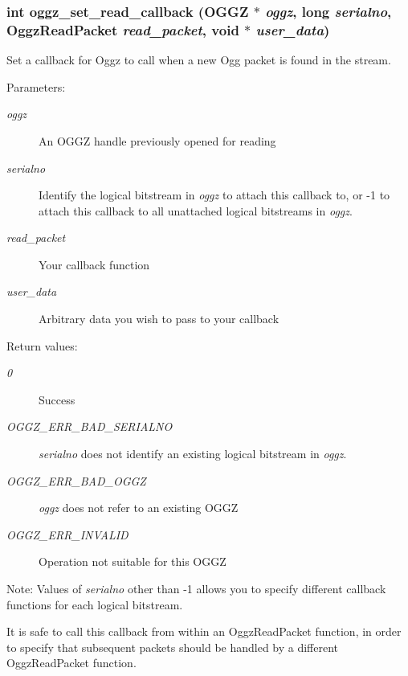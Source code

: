 \subsubsection{\setlength{\rightskip}{0pt plus 5cm}int oggz\_\-set\_\-read\_\-callback ({\bf OGGZ} $\ast$ {\em oggz}, long {\em serialno}, {\bf Oggz\-Read\-Packet} {\em read\_\-packet}, void $\ast$ {\em user\_\-data})}\label{group__read__api_ga1}


Set a callback for Oggz to call when a new Ogg packet is found in the stream. 

\begin{Desc}
\item[Parameters:]
\begin{description}
\item[{\em oggz}]An OGGZ handle previously opened for reading \item[{\em serialno}]Identify the logical bitstream in {\em oggz\/} to attach this callback to, or -1 to attach this callback to all unattached logical bitstreams in {\em oggz\/}. \item[{\em read\_\-packet}]Your callback function \item[{\em user\_\-data}]Arbitrary data you wish to pass to your callback \end{description}
\end{Desc}
\begin{Desc}
\item[Return values:]
\begin{description}
\item[{\em 0}]Success \item[{\em OGGZ\_\-ERR\_\-BAD\_\-SERIALNO}]{\em serialno\/} does not identify an existing logical bitstream in {\em oggz\/}. \item[{\em OGGZ\_\-ERR\_\-BAD\_\-OGGZ}]{\em oggz\/} does not refer to an existing OGGZ \item[{\em OGGZ\_\-ERR\_\-INVALID}]Operation not suitable for this OGGZ\end{description}
\end{Desc}
\begin{Desc}
\item[Note:]Values of {\em serialno\/} other than -1 allows you to specify different callback functions for each logical bitstream.

It is safe to call this callback from within an Oggz\-Read\-Packet function, in order to specify that subsequent packets should be handled by a different Oggz\-Read\-Packet function. \end{Desc}
